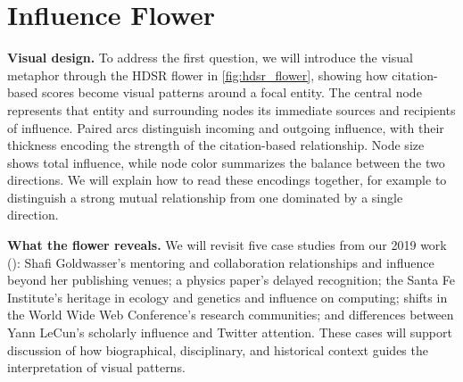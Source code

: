 \documentclass[]{hdsr}
\begin{document}


\section{Influence Flower}

\textbf{Visual design.}
To address the first question, we will introduce the visual metaphor through the HDSR flower in \cref{fig:hdsr_flower}, showing how citation-based scores become visual patterns around a focal entity. The central node represents that entity and surrounding nodes its immediate sources and recipients of influence.
Paired arcs distinguish incoming and outgoing influence, with their thickness encoding the strength of the citation-based relationship. Node size shows total influence, while node color summarizes the balance between the two directions. We will explain how to read these encodings together, for example to distinguish a strong mutual relationship from one dominated by a single direction.


\textbf{What the flower reveals.}
We will revisit five case studies from our 2019 work (\cite{shin2019influence}): Shafi Goldwasser's mentoring and collaboration relationships and influence beyond her publishing venues; a physics paper's delayed recognition; the Santa Fe Institute's heritage in ecology and genetics and influence on computing; shifts in the World Wide Web Conference's research communities; and differences between Yann LeCun's scholarly influence and Twitter attention. These cases will support discussion of how biographical, disciplinary, and historical context guides the interpretation of visual patterns.

\end{document}
